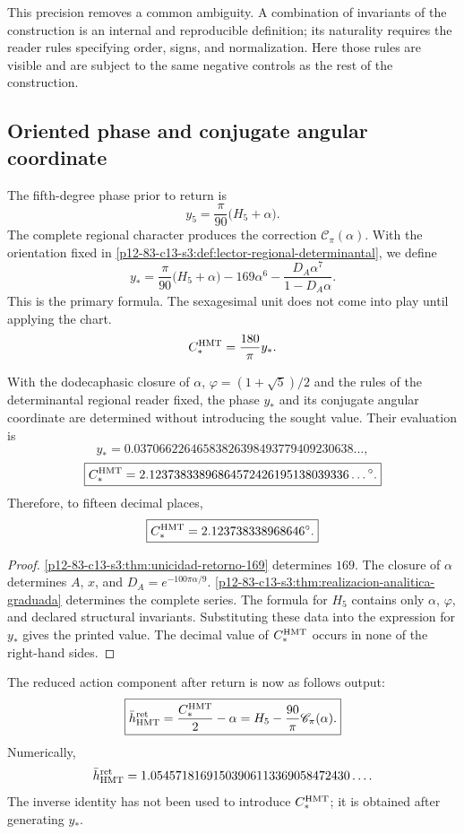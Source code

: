 This precision removes a common ambiguity. A combination of
invariants of the construction is an internal and reproducible definition; its
naturality requires the reader rules specifying order, signs, and
normalization. Here those rules are visible and are subject to the same
negative controls as the rest of the construction.

\subsection{Oriented phase and conjugate angular coordinate}

The fifth-degree phase prior to return is
\[
y_5=\frac\pi{90}\bigl(H_5+\alpha\bigr).
\]
The complete regional character produces the correction
\(\mathscr C_\pi(\alpha)\). With the orientation fixed in
\cref{p12-83-c13-s3:def:lector-regional-determinantal}, we define
\[
\boxed{
y_*=\frac\pi{90}\bigl(H_5+\alpha\bigr)
-169\alpha^6
-\frac{D_A\alpha^7}{1-D_A\alpha}.}
\]
This is the primary formula. The sexagesimal unit does not come into play until applying the chart.
\[
C_*^{\rm HMT}=\frac{180}{\pi}y_*.
\]

\begin{theorem}
\label{p12-83-c13-s3:thm:contraangulo-regional}
With the dodecaphasic closure of \(\alpha\),
\(\varphi=(1+\sqrt5)/2\) and the rules of the determinantal regional reader fixed, the
phase \(y_*\) and its conjugate angular coordinate are determined without introducing the sought
value. Their evaluation is
\[
\boxed{
y_*=0.03706622646583826398493779409230638\ldots,}
\]
\[
\boxed{
C_*^{\rm HMT}
=2.12373833896864572426195138039336\ldots{}^\circ.}
\]
Therefore, to fifteen decimal places,
\[
\boxed{C_*^{\rm HMT}=2.123738338968646^\circ.}
\]
\end{theorem}

\begin{proof}
\cref{p12-83-c13-s3:thm:unicidad-retorno-169} determines \(169\). The closure of
\(\alpha\) determines \(A\), \(x\), and
\(D_A=e^{-100\pi\alpha/9}\). \cref{p12-83-c13-s3:thm:realizacion-analitica-graduada}
determines the complete series. The formula for \(H_5\) contains only
\(\alpha\), \(\varphi\), and declared structural invariants. Substituting
these data into the expression for \(y_*\) gives the printed value. The decimal value
of \(C_*^{\rm HMT}\) occurs in none of the right-hand sides.
\end{proof}

The reduced action component after return is now as follows
output:
\[
\boxed{
\bar h_{\rm HMT}^{\rm ret}
=\frac{C_*^{\rm HMT}}2-\alpha
=H_5-\frac{90}{\pi}\mathscr C_\pi(\alpha).}
\]
Numerically,
\[
\bar h_{\rm HMT}^{\rm ret}
=1.05457181691503906113369058472430\ldots.
\]
The inverse identity has not been used to introduce \(C_*^{\rm HMT}\); it is
obtained after generating \(y_*\).

